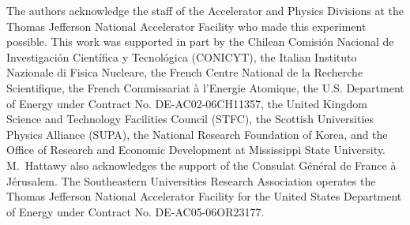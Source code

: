\documentclass[twocolumn,nofootinbib,showpacs,prl,superscriptaddress,secnumarabic,amssymb,nobibnotes,aps,floatfix]{revtex4}
\begin{document}

The authors acknowledge the staff of the Accelerator and Physics Divisions at 
the Thomas Jefferson National Accelerator Facility who made this experiment 
possible. This work was supported in part by the Chilean Comisi\'on Nacional de 
Investigaci\'on Cient\'ifica y Tecnol\'ogica (CONICYT), the Italian Instituto 
Nazionale di Fisica Nucleare, the French Centre National de la Recherche 
Scientifique, the French Commissariat \`a l'Energie Atomique, the U.S.  
Department of Energy under Contract No. DE-AC02-06CH11357, the United Kingdom 
Science and Technology Facilities Council (STFC), the Scottish Universities 
Physics Alliance (SUPA), the National Research Foundation of Korea, and the 
Office of Research and Economic Development at Mississippi State University.  
M.~Hattawy also acknowledges the support of the Consulat G\'en\'eral de France 
\`a J\'erusalem.  The Southeastern Universities Research Association operates 
the Thomas Jefferson National Accelerator Facility for the United States 
Department of Energy under Contract No. DE-AC05-06OR23177.
\end{document}
